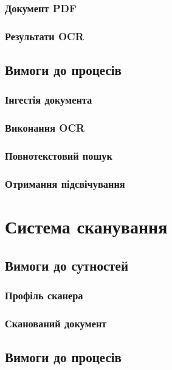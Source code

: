 \subsubsection{Документ PDF}

\subsubsection{Результати OCR}

\subsection{Вимоги до процесів}

\subsubsection{Інгестія документа}

\subsubsection{Виконання OCR}

\subsubsection{Повнотекстовий пошук}

\subsubsection{Отримання підсвічування}

\newpage
\section{Система сканування}

\subsection{Вимоги до сутностей}

\subsubsection{Профіль сканера}

\subsubsection{Сканований документ}

\subsection{Вимоги до процесів}

